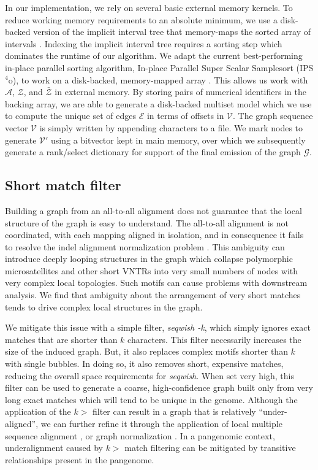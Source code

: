 \documentclass{bioinfo}
\theoremstyle{definition}
\begin{document}
In our implementation, we rely on several basic external memory kernels.
To reduce working memory requirements to an absolute minimum, we use a disk-backed version of the implicit interval tree that memory-maps the sorted array of intervals \citep{mmmulti}.
Indexing the implicit interval tree requires a sorting step which dominates the runtime of our algorithm.
We adapt the current best-performing in-place parallel sorting algorithm, In-place Parallel Super Scalar Samplesort (IPS$^4$o), to work on a disk-backed, memory-mapped array \citep{axtmann2017}.
This allows us work with $\mathcal{A}$, $\mathcal{Z}$, and $\bar{\mathcal{Z}}$ in external memory.
By storing pairs of numerical identifiers in the backing array, we are able to generate a disk-backed multiset model which we use to compute the unique set of edges $\mathcal{E}$ in terms of offsets in $\mathcal{V}$.
The graph sequence vector $\mathcal{V}$ is simply written by appending characters to a file.
We mark nodes to generate $\mathcal{V}'$ using a bitvector kept in main memory, over which we subsequently generate a rank/select dictionary \citep{Gog_2014} for support of the final emission of the graph $\mathcal{G}$.

\subsection{Short match filter}
\label{sec:filter}

Building a graph from an all-to-all alignment does not guarantee that the local structure of the graph is easy to understand.
The all-to-all alignment is not coordinated, with each mapping aligned in isolation, and in consequence it fails to resolve the indel alignment normalization problem \citep{Mose_2019}.
This ambiguity can introduce deeply looping structures in the graph which collapse polymorphic microsatellites and other short VNTRs into very small numbers of nodes with very complex local topologies.
Such motifs can cause problems with downstream analysis.
We find that ambiguity about the arrangement of very short matches tends to drive complex local structures in the graph.

We mitigate this issue with a simple filter, \textit{seqwish -k}, which simply ignores exact matches that are shorter than $k$ characters.
This filter necessarily increases the size of the induced graph.
But, it also replaces complex motifs shorter than $k$ with single bubbles.
In doing so, it also removes short, expensive matches, reducing the overall space requirements for \textit{seqwish}.
When set very high, this filter can be used to generate a coarse, high-confidence graph built only from very long exact matches which will tend to be unique in the genome.
Although the application of the $k>$ filter can result in a graph that is relatively ``under-aligned'', we can further refine it through the application of local multiple sequence alignment \citep{Gao_2020}, or graph normalization \citep{Doerr_2021}.
In a pangenomic context, underalignment caused by $k>$ match filtering can be mitigated by transitive relationships present in the pangenome.
\end{document}
